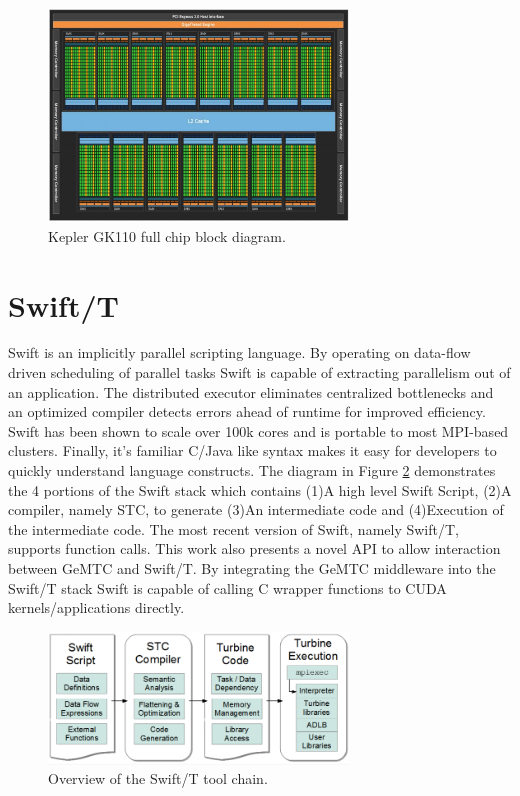 \documentclass[conference]{IEEEtran}
\begin{document}
\begin{figure}[h]
\centering\includegraphics[width=8cm]{imgs/blockdiagram.png}
\caption{Kepler GK110 full chip block diagram.}
\label{fig:block_diagram}
\end{figure}

\section{Swift/T}
Swift is an implicitly parallel scripting language. By operating on data-flow driven scheduling of parallel tasks Swift is capable of extracting parallelism out of an application. The distributed executor eliminates centralized bottlenecks and an optimized compiler detects errors ahead of runtime for improved efficiency. Swift has been shown to scale over 100k cores and is portable to most MPI-based clusters. Finally, it's familiar C/Java like syntax makes it easy for developers to quickly understand language constructs. The diagram in Figure \ref{fig:swiftt} demonstrates the 4 portions of the Swift stack which contains (1)A high level Swift Script, (2)A compiler, namely STC, to generate (3)An intermediate code and (4)Execution of the intermediate code. The most recent version of Swift, namely Swift/T, supports function calls.\cite{wozniak13swift} This work also presents a novel API to allow interaction between GeMTC and Swift/T. By integrating the GeMTC middleware into the Swift/T stack Swift is capable of calling C wrapper functions to CUDA kernels/applications directly. 

\begin{figure}[h]
\centering\includegraphics[width=8cm]{imgs/swiftt.png}
\caption{Overview of the Swift/T tool chain.}
\label{fig:swiftt}
\end{figure}
\end{document}
